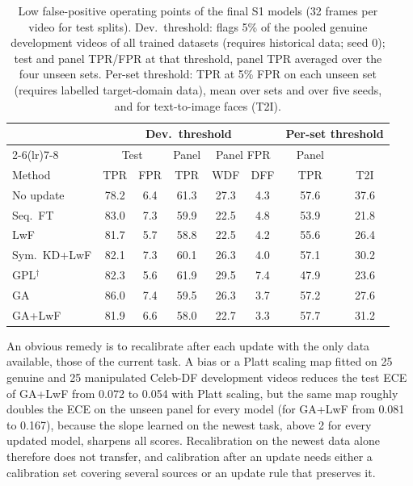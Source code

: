 \documentclass{ieeeaccess}
\begin{document}
\begin{table}[t]
\caption{Low false-positive operating points of the final S1 models (32 frames per video for test splits). Dev.\ threshold: flags 5\% of the pooled genuine development videos of all trained datasets (requires historical data; seed 0); test and panel TPR/FPR at that threshold, panel TPR averaged over the four unseen sets. Per-set threshold: TPR at 5\% FPR on each unseen set (requires labelled target-domain data), mean over sets and over five seeds, and for text-to-image faces (T2I).}
\label{tab:oppoint}
\centering
\footnotesize
\setlength{\tabcolsep}{2.0pt}
\begin{tabular}{@{}lccccccc@{}}
\toprule
& \multicolumn{5}{c}{Dev.\ threshold} & \multicolumn{2}{c}{Per-set threshold} \\
\cmidrule(lr){2-6}\cmidrule(lr){7-8}
& \multicolumn{2}{c}{Test} & Panel & \multicolumn{2}{c}{Panel FPR} & Panel & \\
Method & TPR & FPR & TPR & WDF & DFF & TPR & T2I \\
\midrule
No update & 78.2 & 6.4 & 61.3 & 27.3 & 4.3 & 57.6 & 37.6 \\
Seq.\ FT & 83.0 & 7.3 & 59.9 & 22.5 & 4.8 & 53.9 & 21.8 \\
LwF & 81.7 & 5.7 & 58.8 & 22.5 & 4.2 & 55.6 & 26.4 \\
Sym.\ KD+LwF & 82.1 & 7.3 & 60.1 & 26.3 & 4.0 & 57.1 & 30.2 \\
GPL$^\dagger$ & 82.3 & 5.6 & 61.9 & 29.5 & 7.4 & 47.9 & 23.6 \\
GA & 86.0 & 7.4 & 59.5 & 26.3 & 3.7 & 57.2 & 27.6 \\
GA+LwF & 81.9 & 6.6 & 58.0 & 22.7 & 3.3 & 57.7 & 31.2 \\
\bottomrule
\end{tabular}
\end{table}

An obvious remedy is to recalibrate after each update with the only data available, those of the current task. A bias or a Platt scaling map fitted on 25 genuine and 25 manipulated Celeb-DF development videos reduces the test ECE of GA+LwF from 0.072 to 0.054 with Platt scaling, but the same map roughly doubles the ECE on the unseen panel for every model (for GA+LwF from 0.081 to 0.167), because the slope learned on the newest task, above 2 for every updated model, sharpens all scores. Recalibration on the newest data alone therefore does not transfer, and calibration after an update needs either a calibration set covering several sources or an update rule that preserves it.
\end{document}

